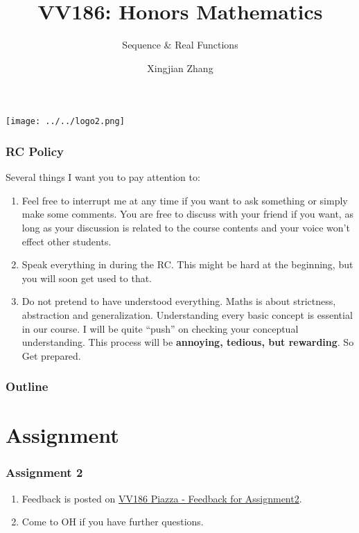\documentclass[10pt, t]{beamer}
\title{VV186: Honors Mathematics}
\subtitle{\large Sequence \& Real Functions}
\institute[UM-SJTU JI]{Univerity of Michigan-Shanghai Jiao Tong University Joint Institute}
\author{Xingjian Zhang}
\newcommand{\alarm}[1]{{\color{bladerunnerred}{#1}}}
\begin{document}
\begin{frame}
    \titlepage
    \begin{center}
        \texttt{[image: ../../logo2.png]}
    \end{center}
\end{frame}

\begin{frame}
    \frametitle{RC Policy}
    Several things I want you to pay attention to:
    \begin{enumerate}
        \item \alarm{Be interactive.} Feel free to interrupt me at any time if you want to ask something or simply make some comments. You are free to discuss with your friend if you want, as long as your discussion is related to the course contents and your voice won't effect other students.
        \item Speak everything in \alarm{English} during the RC. This might be hard at the beginning, but you will soon get used to that.
        \item \alarm{``Question everything.''} Do not pretend to have understood everything. Maths is about strictness, abstraction and generalization. Understanding every basic concept is essential in our course. I will be quite ``push'' on checking your conceptual understanding. This process will be \textbf{annoying, tedious, but rewarding}. So Get prepared.
    \end{enumerate}
\end{frame}

\begin{frame}
    \frametitle{Outline}
    \begin{spacing}{1}
        \tableofcontents
    \end{spacing}
\end{frame}

\section{Assignment}
\begin{frame}
    \frametitle{Assignment 2}
    \begin{enumerate}
        \item Feedback is posted on \href{https://piazza.com/class/kdvbtz3cxva7mb?cid=52}{VV186 Piazza - Feedback for Assignment2}.
        \item Come to OH if you have further questions.
    \end{enumerate}
\end{frame}
\end{document}
